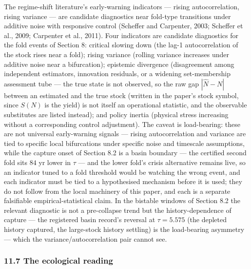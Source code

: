 \documentclass[11pt]{article}
\begin{document}
The regime-shift literature's early-warning indicators --- rising
autocorrelation, rising variance --- are candidate diagnostics near
fold-type transitions under additive noise with responsive control
(Scheffer and Carpenter, 2003; Scheffer et al., 2009; Carpenter et al.,
2011). Four indicators are candidate diagnostics for the fold events of
Section 8: critical slowing down (the lag-1 autocorrelation of the stock
rises near a fold); rising variance (rolling variance increases under
additive noise near a bifurcation); epistemic divergence (disagreement
among independent estimators, innovation residuals, or a widening
set-membership assessment tube --- the true state is not observed, so
the raw gap \(|\hat N - N|\) between an estimated and the true stock
(written in the paper's stock symbol, since \(S(N)\) is the yield) is
not itself an operational statistic, and the observable substitutes are
listed instead); and policy inertia (physical stress increasing without
a corresponding control adjustment). The caveat is load-bearing: these
are not universal early-warning signals --- rising autocorrelation and
variance are tied to specific local bifurcations under specific noise
and timescale assumptions, while the capture onset of Section 8.2 is a
basin boundary --- the certified second fold sits \(84\) yr lower in
\(\tau\) --- and the lower fold's crisis alternative remains live, so an
indicator tuned to a fold threshold would be watching the wrong event,
and each indicator must be tied to a hypothesised mechanism before it is
used; they do not follow from the local machinery of this paper, and
each is a separate falsifiable empirical-statistical claim. In the
bistable windows of Section 8.2 the relevant diagnostic is not a
pre-collapse trend but the history-dependence of capture --- the
registered basin record's reversal at \(\tau = 5.575\) (the depleted
history captured, the large-stock history settling) is the load-bearing
asymmetry --- which the variance/autocorrelation pair cannot see.

\subsubsection{11.7 The ecological
reading}\label{the-ecological-reading}
\end{document}
